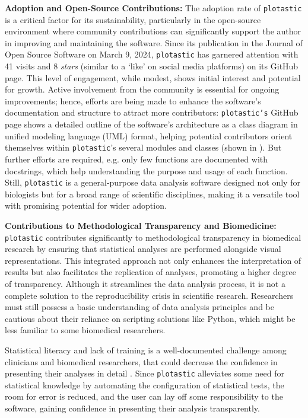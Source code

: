 \textbf{Adoption and Open-Source Contributions:}
The adoption rate of \texttt{plotastic} is a critical factor for its
sustainability, particularly in the open-source environment where community
contributions can significantly support the author in improving and maintaining
the software. Since its publication in the Journal of Open Source Software on
March 9, 2024, \texttt{plotastic} has garnered attention with 41 visits and 8
\emph{stars} (similar to a `like' on social media platforms) on its GitHub page.
This level of engagement, while modest, shows initial interest and potential for
growth. Active involvement from the community is essential for ongoing
improvements; hence, efforts are being made to enhance the software's
documentation and structure to attract more contributors: \texttt{plotastic's}
GitHub page shows a detailed outline of the software's architecture as a class
diagram in unified modeling language (UML) format, helping potential
contributors orient themselves within \texttt{plotastic}'s several modules and
classes (shown in ). But further efforts are
required, e.g. only few functions are documented with docstrings, which help
understanding the purpose and usage of each function. Still, \texttt{plotastic}
is a general-purpose data analysis software designed not only for biologists but
for a broad range of scientific disciplines, making it a versatile tool with
promising potential for wider adoption.





\textbf{Contributions to Methodological Transparency and Biomedicine:}
\texttt{plotastic} contributes significantly to methodological transparency in
biomedical research by ensuring that statistical analyses are performed
alongside visual representations. This integrated approach not only enhances the
interpretation of results but also facilitates the replication of analyses,
promoting a higher degree of transparency. Although it streamlines the data
analysis process, it is not a complete solution to the reproducibility crisis in
scientific research. Researchers must still possess a basic understanding of
data analysis principles and be cautious about their reliance on scripting
solutions like Python, which might be less familiar to some biomedical
researchers. 

Statistical literacy and lack of training is a well-documented challenge among
clinicians and biomedical researchers, that could decrease the confidence in
presenting their analyses in detail
\cite{lakhlifiIllusionKnowledgeStatistics2023, federerDataLiteracyTraining2016}.
Since \texttt{plotastic} alleviates some need for statistical knowledge by
automating the configuration of statistical tests, the room for error is
reduced, and the user can lay off some responsibility to the software, gaining
confidence in presenting their analysis transparently. 


